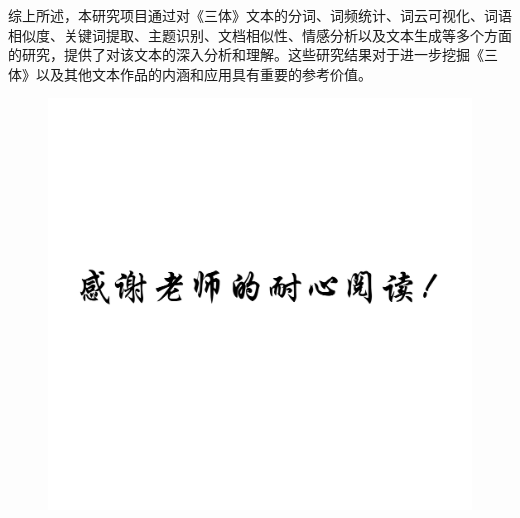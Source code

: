 \documentclass[12pt]{xjtureport}
\begin{document}
综上所述，本研究项目通过对《三体》文本的分词、词频统计、词云可视化、词语相似度、关键词提取、主题识别、文档相似性、情感分析以及文本生成等多个方面的研究，提供了对该文本的深入分析和理解。这些研究结果对于进一步挖掘《三体》以及其他文本作品的内涵和应用具有重要的参考价值。


\newpage
\thispagestyle{empty}


\begin{figure}[!htbp]
    \centering
    \includegraphics[width=\linewidth]{figures/封底.png}
\end{figure}
\end{document}
